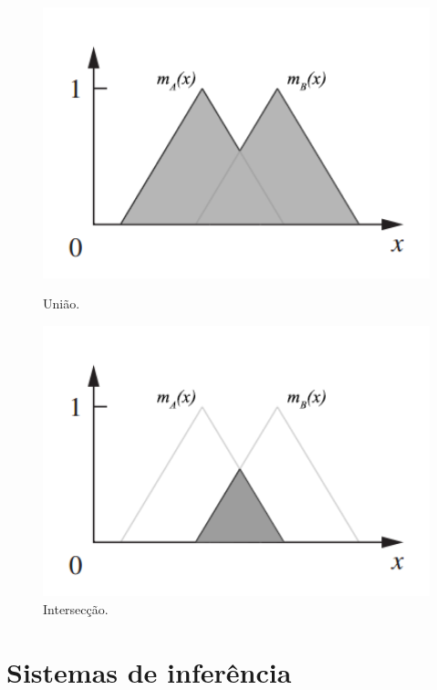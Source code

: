 \documentclass[12pt]{article}
\begin{document}
\begin{figure}
    \centering
    \begin{minipage}{0.45\textwidth}
        \centering
        \includegraphics[width=1.1\textwidth]{union.png}
        \caption{União.}
        \label{fig:union}
    \end{minipage}\hfill
    \begin{minipage}{0.45\textwidth}
        \centering
        \includegraphics[width=1.1\textwidth]{intersection.png}
        \caption{Intersecção.}
        \label{fig:intersection}
    \end{minipage}
\end{figure}

\section{Sistemas de inferência} \label{sec:systems}
\end{document}
